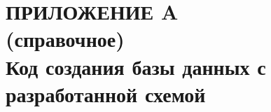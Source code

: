 \renewcommand{\thefigure}{\Asbuk{section}.\arabic{figure}}
\renewcommand{\thetable}{\Asbuk{section}.\arabic{table}}
\renewcommand{\thelstlisting}{\Asbuk{section}.\arabic{lstlisting}}

\section*{ПРИЛОЖЕНИЕ A \\ (справочное) \\ Код создания базы данных с разработанной схемой}
\label{sec:appendix_a}

\pagestyle{fancy}
\fancyhf{}  %
\fancyfoot[R]{\thepage}
\renewcommand{\headrulewidth}{0pt}
\renewcommand{\footrulewidth}{0pt}

\setlength{\headheight}{10mm}
\setlength{\headsep}{\baselineskip}

\thispagestyle{plain}

\setcounter{section}{1}
\setcounter{figure}{0}
\setcounter{table}{0}
\setcounter{lstlisting}{0}


